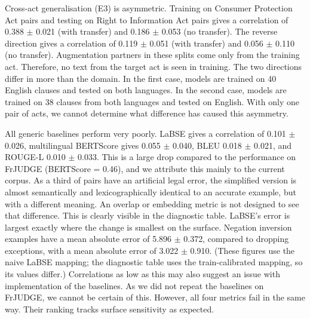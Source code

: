 \documentclass[conference]{IEEEtran}
\begin{document}
Cross-act generalisation (E3) is asymmetric. Training on Consumer Protection Act pairs and testing on Right to Information Act pairs gives a correlation of 0.388 \ensuremath{\pm} 0.021 (with transfer) and 0.186 \ensuremath{\pm} 0.053 (no transfer). The reverse direction gives a correlation of 0.119 \ensuremath{\pm} 0.051 (with transfer) and 0.056 \ensuremath{\pm} 0.110 (no transfer). Augmentation partners in these splits come only from the training act. Therefore, no text from the target act is seen in training. The two directions differ in more than the domain. In the first case, models are trained on 40 English clauses and tested on both languages. In the second case, models are trained on 38 clauses from both languages and tested on English. With only one pair of acts, we cannot determine what difference has caused this asymmetry.

All generic baselines perform very poorly. LaBSE gives a correlation of 0.101 \ensuremath{\pm} 0.026, multilingual BERTScore gives 0.055 \ensuremath{\pm} 0.040, BLEU 0.018 \ensuremath{\pm} 0.021, and ROUGE-L 0.010 \ensuremath{\pm} 0.033. This is a large drop compared to the performance on FrJUDGE (BERTScore = 0.46), and we attribute this mainly to the current corpus. As a third of pairs have an artificial legal error, the simplified version is almost semantically and lexicographically identical to an accurate example, but with a different meaning. An overlap or embedding metric is not designed to see that difference. This is clearly visible in the diagnostic table. LaBSE's error is largest exactly where the change is smallest on the surface. Negation inversion examples have a mean absolute error of 5.896 \ensuremath{\pm} 0.372, compared to dropping exceptions, with a mean absolute error of 3.022 \ensuremath{\pm} 0.910. (These figures use the naive LaBSE mapping; the diagnostic table uses the train-calibrated mapping, so its values differ.) Correlations as low as this may also suggest an issue with implementation of the baselines. As we did not repeat the baselines on FrJUDGE, we cannot be certain of this. However, all four metrics fail in the same way. Their ranking tracks surface sensitivity as expected.
\end{document}
